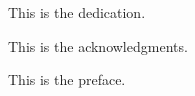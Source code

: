 
%
%
%
%
%

\begin{dedication}
  This is the dedication.
\end{dedication}

\begin{acknowledgments}
  This is the acknowledgments.
\end{acknowledgments}

\begin{preface}
  This is the preface.
\end{preface}

\tableofcontents

\listoftables

